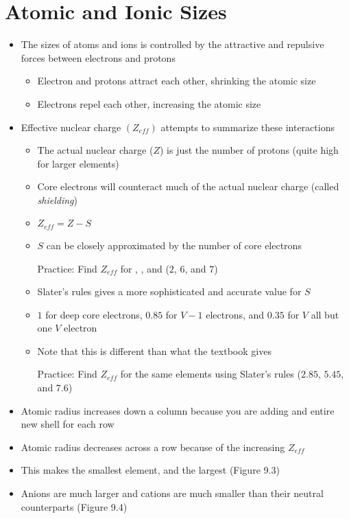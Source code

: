 \documentclass[12pt, openany, letterpaper]{memoir}
\begin{document}
\section{Atomic and Ionic Sizes}
\begin{itemize}
	\item The sizes of atoms and ions is controlled by the attractive and repulsive forces between electrons and protons
	\begin{itemize}
		\item Electron and protons attract each other, shrinking the atomic size
		\item Electrons repel each other, increasing the atomic size
	\end{itemize}
	\item Effective nuclear charge $\left(Z_{eff}\right)$ attempts to summarize these interactions
	\begin{itemize}
		\item The actual nuclear charge ($Z$) is just the number of protons (quite high for larger elements)
		\item Core electrons will counteract much of the actual nuclear charge (called \emph{shielding})
		\item $Z_{eff} = Z-S$
		\item $S$ can be closely approximated by the number of core electrons
		
		Practice: Find $Z_{eff}$ for , , and  ($2$, $6$, and $7$)
		\item Slater's rules gives a more sophisticated and accurate value for $S$
		\item $1$ for deep core electrons, $0.85$ for $V-1$ electrons, and $0.35$ for $V$ all but one $V$ electron
		\item Note that this is different than what the textbook gives
		
		Practice: Find $Z_{eff}$ for the same elements using Slater's rules ($2.85$, $5.45$, and $7.6$)
	\end{itemize}
	\item Atomic radius increases down a column because you are adding and entire new shell for each row
	\item Atomic radius decreases across a row because of the increasing $Z_{eff}$
	\item This makes  the smallest element, and  the largest (Figure 9.3)
	\item Anions are much larger and cations are much smaller than their neutral counterparts (Figure 9.4)
\end{itemize}
\end{document}
